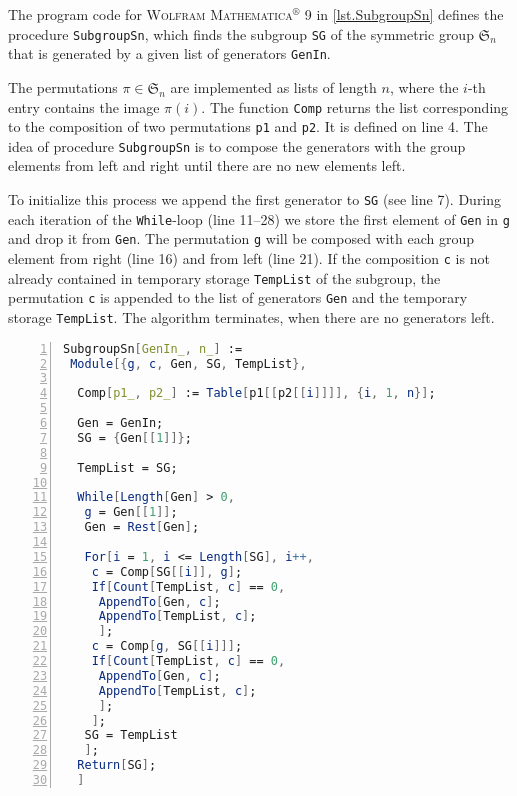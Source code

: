\sloppypar
The program code for \textsc{Wolfram Mathematica$^\circledR$ 9} in \cref{lst.SubgroupSn} defines the procedure \verb+SubgroupSn+, which finds the subgroup \verb+SG+ of the symmetric group $\mathfrak{S}_n$ that is generated by a given list of generators \verb+GenIn+.

The permutations $\pi\in\mathfrak{S}_n$ are implemented as lists of length $n$, where the $i$-th entry contains the image $\pi(i)$. The function \verb+Comp+ returns the list corresponding to the composition of two permutations \verb+p1+ and \verb+p2+. It is defined on line 4. The idea of procedure \verb+SubgroupSn+ is to compose the generators with the group elements from left and right until there are no new elements left.

To initialize this process we append the first generator to \verb+SG+ (see line 7). During each iteration of the \verb+While+-loop (line 11--28) we store the first element of \verb+Gen+ in \verb+g+ and drop it from \verb+Gen+. The permutation \verb+g+ will be composed with each group element from right (line 16) and from left (line 21). If the composition \verb+c+ is not already contained in temporary storage \verb+TempList+ of the subgroup, the permutation \verb+c+ is appended to the list of generators \verb+Gen+ and the temporary storage \verb+TempList+. The algorithm terminates, when there are no generators left.

\begin{lstlisting}[float, caption=Algorithm finding a subgroup of $\mathfrak S_n$,
                   label=lst.SubgroupSn,
                   language=Mathematica, 
                   numbers=left,
                   numberstyle=\tiny,
                   stepnumber=2,
                   numbersep=5pt]
SubgroupSn[GenIn_, n_] :=
 Module[{g, c, Gen, SG, TempList},
  
  Comp[p1_, p2_] := Table[p1[[p2[[i]]]], {i, 1, n}];
  
  Gen = GenIn;
  SG = {Gen[[1]]};
  
  TempList = SG;
  
  While[Length[Gen] > 0,
   g = Gen[[1]];
   Gen = Rest[Gen];
   
   For[i = 1, i <= Length[SG], i++,
    c = Comp[SG[[i]], g];
    If[Count[TempList, c] == 0,
     AppendTo[Gen, c];
     AppendTo[TempList, c];
     ];
    c = Comp[g, SG[[i]]];
    If[Count[TempList, c] == 0,
     AppendTo[Gen, c];
     AppendTo[TempList, c];
     ];
    ];
   SG = TempList
   ];
  Return[SG];
  ]
\end{lstlisting}

